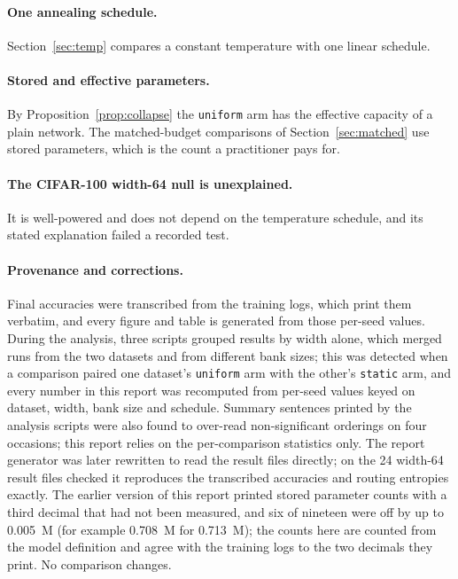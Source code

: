 \documentclass[10pt,a4paper]{article}
\begin{document}
\paragraph{One annealing schedule.} Section~\ref{sec:temp} compares a
constant temperature with one linear schedule.

\paragraph{Stored and effective parameters.} By
Proposition~\ref{prop:collapse} the \texttt{uniform} arm has the
effective capacity of a plain network. The matched-budget comparisons of
Section~\ref{sec:matched} use stored parameters, which is the count a
practitioner pays for.

\paragraph{The CIFAR-100 width-64 null is unexplained.} It is
well-powered and does not depend on the temperature schedule, and its
stated explanation failed a recorded test.

\paragraph{Provenance and corrections.} Final accuracies were transcribed
from the training logs, which print them verbatim, and every figure and
table is generated from those per-seed values. During the analysis, three
scripts grouped results by width alone, which merged runs from the two
datasets and from different bank sizes; this was detected when a
comparison paired one dataset's \texttt{uniform} arm with the other's
\texttt{static} arm, and every number in this report was recomputed from
per-seed values keyed on dataset, width, bank size and schedule. Summary
sentences printed by the analysis scripts were also found to over-read
non-significant orderings on four occasions; this report relies on the
per-comparison statistics only. The report generator was later
rewritten to read the result files directly; on the 24 width-64 result
files checked it reproduces the transcribed accuracies and routing
entropies exactly. The earlier version of this report printed stored
parameter counts with a third decimal that had not been measured, and six
of nineteen were off by up to \SI{0.005}{M} (for example \SI{0.708}{M}
for \SI{0.713}{M}); the counts here are counted from the model
definition and agree with the training logs to the two decimals they
print. No comparison changes.
\end{document}
